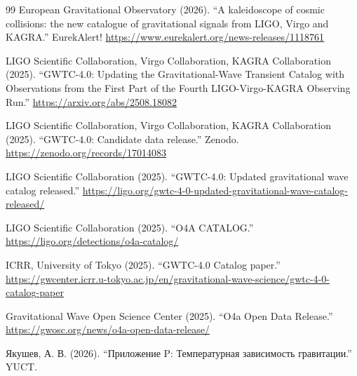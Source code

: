 \documentclass[12pt,a4paper]{article}
\theoremstyle{remark}
\begin{document}
\begin{thebibliography}{99}
		European Gravitational Observatory (2026). ``A kaleidoscope of cosmic collisions: the new catalogue of gravitational signals from LIGO, Virgo and KAGRA.'' EurekAlert! \url{https://www.eurekalert.org/news-releases/1118761}
		
		LIGO Scientific Collaboration, Virgo Collaboration, KAGRA Collaboration (2025). ``GWTC-4.0: Updating the Gravitational-Wave Transient Catalog with Observations from the First Part of the Fourth LIGO-Virgo-KAGRA Observing Run.'' \url{https://arxiv.org/abs/2508.18082}
		
		LIGO Scientific Collaboration, Virgo Collaboration, KAGRA Collaboration (2025). ``GWTC-4.0: Candidate data release.'' Zenodo. \url{https://zenodo.org/records/17014083}
		
		LIGO Scientific Collaboration (2025). ``GWTC-4.0: Updated gravitational wave catalog released.'' \url{https://ligo.org/gwtc-4-0-updated-gravitational-wave-catalog-released/}
		
		LIGO Scientific Collaboration (2025). ``O4A CATALOG.'' \url{https://ligo.org/detections/o4a-catalog/}
		
		ICRR, University of Tokyo (2025). ``GWTC-4.0 Catalog paper.'' \url{https://gwcenter.icrr.u-tokyo.ac.jp/en/gravitational-wave-science/gwtc-4-0-catalog-paper}
		
		Gravitational Wave Open Science Center (2025). ``O4a Open Data Release.'' \url{https://gwosc.org/news/o4a-open-data-release/}
		
		Якушев, А. В. (2026). ``Приложение P: Температурная зависимость гравитации.'' YUCT.
	\end{thebibliography}
	
\end{document}
